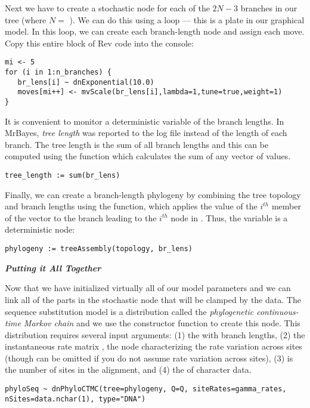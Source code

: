 Next we have to create a stochastic node for each of the $2N-3$ branches in our tree (where $N=$ ). 
We can do this using a  loop --- this is a plate in our graphical model. In this loop, we can create each branch-length node and assign each move. Copy this entire block of Rev code into the console:
{\tt \small \begin{snugshade*}
\begin{lstlisting}
mi <- 5
for (i in 1:n_branches) {
   br_lens[i] ~ dnExponential(10.0)
   moves[mi++] <- mvScale(br_lens[i],lambda=1,tune=true,weight=1) 
}
\end{lstlisting}
\end{snugshade*}}

It is convenient to monitor a deterministic variable of the branch lengths. In MrBayes, \textit{tree length} was reported to the log file instead of the length of each branch. The tree length is the sum of all branch lengths and this can be computed using the  function which calculates the sum of any vector of values.
{\tt \begin{snugshade*}
\begin{lstlisting}
tree_length := sum(br_lens)
\end{lstlisting}
\end{snugshade*}}

Finally, we can create a branch-length phylogeny by combining the tree topology and branch lengths using the  function, which applies the value of the $i^{th}$ member of the  vector to the branch leading to the $i^{th}$ node in . Thus, the  variable is a deterministic node: 

{\tt \begin{snugshade*}
\begin{lstlisting}
phylogeny := treeAssembly(topology, br_lens)
\end{lstlisting}
\end{snugshade*}}



\textbf{\textit{Putting it All Together}}

Now that we have initialized virtually all of our model parameters and we can link all of the parts in the stochastic node that will be clamped by the data. 
The sequence substitution model is a distribution called the \textit{phylogenetic continuous-time Markov chain} and we use the  constructor function to create this node.
This distribution requires several input arguments: (1) the  with branch lengths, (2) the instantaneous rate matrix , the node characterizing the rate variation across sites (though  can be omitted if you do not assume rate variation across sites), (3)  is the number of sites in the alignment, and (4) the  of character data.
{\tt \begin{snugshade*}
\begin{lstlisting}
phyloSeq ~ dnPhyloCTMC(tree=phylogeny, Q=Q, siteRates=gamma_rates, nSites=data.nchar(1), type="DNA")
\end{lstlisting}
\end{snugshade*}}


